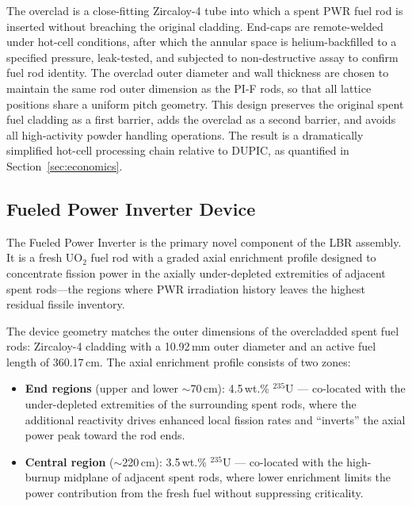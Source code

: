 The overclad is a close-fitting Zircaloy-4 tube into which a spent PWR fuel
rod is inserted without breaching the original cladding. End-caps are
remote-welded under hot-cell conditions, after which the annular space is
helium-backfilled to a specified pressure, leak-tested, and subjected to
non-destructive assay to confirm fuel rod identity. The overclad outer
diameter and wall thickness are chosen to maintain the same rod outer
dimension as the PI-F rods, so that all lattice positions share a uniform
pitch geometry. This design preserves the original spent fuel cladding as a
first barrier, adds the overclad as a second barrier, and avoids all
high-activity powder handling operations. The result is a dramatically
simplified hot-cell processing chain relative to DUPIC, as quantified in
Section~\ref{sec:economics}.

\subsection{Fueled Power Inverter Device}

The Fueled Power Inverter is the primary novel component of the LBR assembly.
It is a fresh UO$_2$ fuel rod with a graded axial enrichment profile designed
to concentrate fission power in the axially under-depleted extremities of
adjacent spent rods---the regions where PWR irradiation history leaves the
highest residual fissile inventory.

The device geometry matches the outer dimensions of the overcladded spent fuel
rods: Zircaloy-4 cladding with a 10.92\,mm outer diameter and an active fuel
length of 360.17\,cm. The axial enrichment profile consists of two zones:
\begin{itemize}
    \item \textbf{End regions} (upper and lower $\sim$70\,cm): 4.5\,wt.\%
    $^{235}$U --- co-located with the under-depleted extremities of the
    surrounding spent rods, where the additional reactivity drives enhanced
    local fission rates and ``inverts'' the axial power peak toward the rod
    ends.
    \item \textbf{Central region} ($\sim$220\,cm): 3.5\,wt.\% $^{235}$U ---
    co-located with the high-burnup midplane of adjacent spent rods, where
    lower enrichment limits the power contribution from the fresh fuel
    without suppressing criticality.
\end{itemize}

